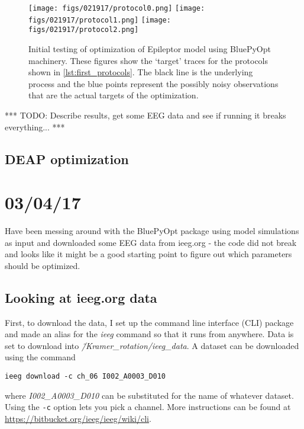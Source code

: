 \documentclass[11pt]{article}
\begin{document}
			\begin{figure}[htbp]
				\centering
				\texttt{[image: figs/021917/protocol0.png]}
				\texttt{[image: figs/021917/protocol1.png]}
				\texttt{[image: figs/021917/protocol2.png]}
				\caption{Initial testing of optimization of Epileptor model using BluePyOpt machinery. These figures show the `target' traces for the protocols shown in \ref{lst:first_protocols}. The black line is the underlying process and the blue points represent the possibly noisy observations that are the actual targets of the optimization.}
				\label{fig:first_protocols}
			\end{figure}

			

			

			*** TODO: Describe results, get some EEG data and see if running it breaks everything... ***


		

	\subsection{DEAP optimization} %
		\label{sub:deap_optimization}
		


\section{03/04/17} %
	\label{sec:03_04_17}

	Have been messing around with the BluePyOpt package using model simulations as input and downloaded some EEG data from ieeg.org - the code did not break and looks like it might be a good starting point to figure out which parameters should be optimized.

	\subsection{Looking at ieeg.org data} %
		\label{sub:looking_at_ieeg_org_data}
		First, to download the data, I set up the command line interface (CLI) package and made an alias for the \textit{ieeg} command so that it runs from anywhere. Data is set to download into \textit{\~/Kramer\_rotation/ieeg\_data}. A dataset can be downloaded using the command
		\begin{lstlisting} 
ieeg download -c ch_06 I002_A0003_D010
	 	\end{lstlisting}
	 	where \textit{I002\_A0003\_D010} can be substituted for the name of whatever dataset. Using the \verb|-c| option lets you pick a channel. More instructions can be found at \break \href{https://bitbucket.org/ieeg/ieeg/wiki/cli}{https://bitbucket.org/ieeg/ieeg/wiki/cli}.
\end{document}
